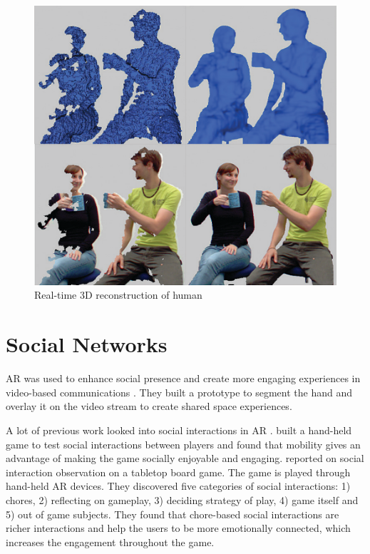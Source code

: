 \begin{figure}
    \centering
    \includegraphics[width=0.8\linewidth]{images/Fuchs2014.PNG}
    \caption{Real-time 3D reconstruction of human \cite{Fuchs2014}}
    \label{fig:Fuchs2014}
\end{figure}

\section{Social Networks}

AR was used to enhance social presence and create more engaging experiences in video-based communications \cite{Almeida2012}. They built a prototype to segment the hand and overlay it on the video stream to create shared space experiences.

A lot of previous work looked into social interactions in AR \cite{Schmalstieg_144, Xu2008, Xu2011, Faas2010}. \textcite{Schmalstieg_144} built a hand-held game to test social interactions between players and found that mobility gives an advantage of making the game socially enjoyable and engaging. \textcite{Xu2011} reported on social interaction observation on a tabletop board game. The game is played through hand-held AR devices. They discovered five categories of social interactions: 1) chores, 2) reflecting on gameplay, 3) deciding strategy of play, 4) game itself and 5) out of game subjects. They found that chore-based social interactions are richer interactions and help the users to be more emotionally connected, which increases the engagement throughout the game.

